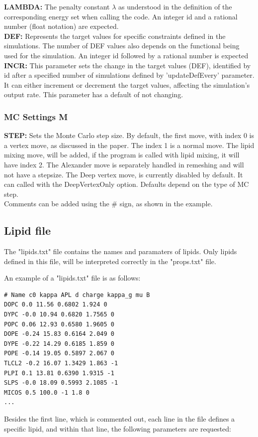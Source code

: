 \documentclass[11pt]{article}
\begin{document}
\noindent
\textbf{LAMBDA: } The penalty constant $\lambda$ as understood in the definition of the corresponding energy set when calling the code. An integer id and a rational number (float notation) are expected. \\
\noindent
\textbf{DEF: } Represents the target values for specific constraints defined in the simulations. The number of DEF values also depends on the functional being used for the simulation. An integer id followed by a rational number is expected\\
\noindent
\textbf{INCR: } This parameter sets the change in the target values (DEF), identified by id after a specified number of simulations defined by 'updateDefEvery' parameter. It can either increment or decrement the target values, affecting the simulation's output rate. 
This parameter has a default of not changing.

\subsubsection{MC Settings M}

\noindent
\textbf{STEP: } Sets the Monte Carlo step size. By default, the first move, with index 0 is a vertex move, as discussed in the paper. The index 1 is a normal move. The lipid mixing move, will be added, if the program is called with lipid mixing, it will have index 2.
The Alexander move is separately handled in remeshing and will not have a stepsize. The Deep vertex move, is currently disabled by default. It can called with the DeepVertexOnly option.
Defaults depend on the type of MC step.\\
\noindent
Comments can be added using the \# sign, as shown in the example.
\subsection{Lipid file}
The "lipids.txt" file contains the names and paramaters of lipids. Only lipids defined in this file, will be interpreted correctly in the "props.txt" file. 

\noindent
An example of a "lipids.txt" file is as follows:
\begin{mdframed}[backgroundcolor=lightgray, linecolor=lightgray]  %

\begin{verbatim}
# Name c0 kappa APL d charge kappa_g mu B
DOPC 0.0 11.56 0.6802 1.924 0
DYPC -0.0 10.94 0.6820 1.7565 0
POPC 0.06 12.93 0.6580 1.9605 0
DOPE -0.24 15.83 0.6164 2.049 0
DYPE -0.22 14.29 0.6185 1.859 0
POPE -0.14 19.05 0.5897 2.067 0
TLCL2 -0.2 16.07 1.3429 1.863 -1
PLPI 0.1 13.81 0.6390 1.9315 -1
SLPS -0.0 18.09 0.5993 2.1085 -1
MICOS 0.5 100.0 -1 1.8 0
...
\end{verbatim}
\end{mdframed}
Besides the first line, which is commented out,
each line in the file defines a specific lipid, and within that line, the following parameters are requested:
\end{document}
